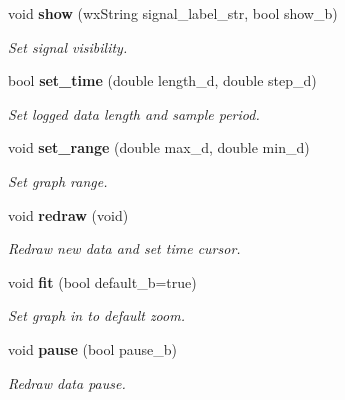 \begin{DoxyCompactItemize}
void \textbf{ show} (wx\+String signal\+\_\+label\+\_\+str, bool show\+\_\+b)
\begin{DoxyCompactList}\small\item\em Set signal visibility. \end{DoxyCompactList}\item 
bool \textbf{ set\+\_\+time} (double length\+\_\+d, double step\+\_\+d)
\begin{DoxyCompactList}\small\item\em Set logged data length and sample period. \end{DoxyCompactList}\item 
void \textbf{ set\+\_\+range} (double max\+\_\+d, double min\+\_\+d)
\begin{DoxyCompactList}\small\item\em Set graph range. \end{DoxyCompactList}\item 
void \textbf{ redraw} (void)
\begin{DoxyCompactList}\small\item\em Redraw new data and set time cursor. \end{DoxyCompactList}\item 
void \textbf{ fit} (bool default\+\_\+b=true)
\begin{DoxyCompactList}\small\item\em Set graph in to default zoom. \end{DoxyCompactList}\item 
void \textbf{ pause} (bool pause\+\_\+b)
\begin{DoxyCompactList}\small\item\em Redraw data pause. \end{DoxyCompactList}\end{DoxyCompactItemize}
